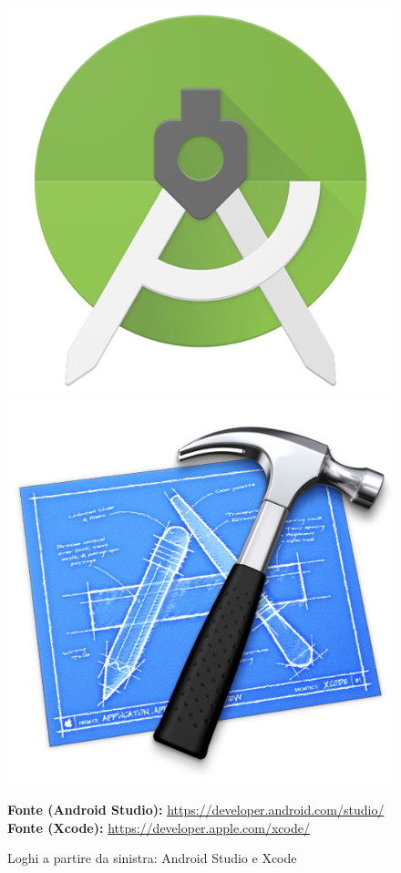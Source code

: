 \begin{figure}[H]
\centering
\includegraphics[scale=0.15]{immagini/android_studio.png}\quad\includegraphics[scale=0.15]{immagini/xcode.jpg}
\caption{Loghi a partire da sinistra: Android Studio e Xcode}
\small{\textbf{Fonte (Android Studio):} \url{https://developer.android.com/studio/}}\\
\small{\textbf{Fonte (Xcode):} \url{https://developer.apple.com/xcode/}}
\end{figure}

